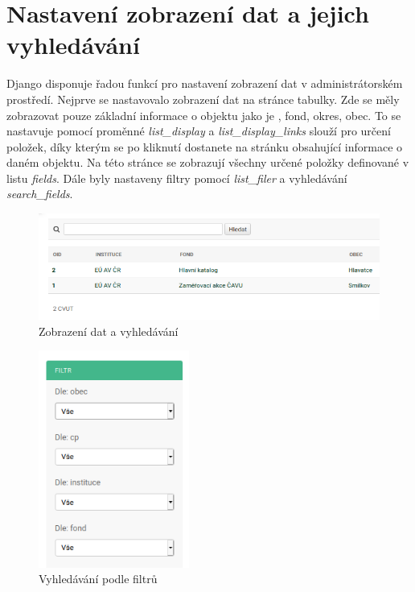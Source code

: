 \section{Nastavení zobrazení dat a jejich vyhledávání}

Django disponuje řadou funkcí pro nastavení zobrazení dat v administrátorském prostředí. Nejprve se nastavovalo zobrazení dat na stránce tabulky. Zde se měly zobrazovat pouze základní informace o objektu jako je , fond, okres, obec. To se nastavuje pomocí proměnné \emph{list\_display} a \emph{list\_display\_links} slouží pro určení položek, díky kterým se po kliknutí dostanete na stránku obsahující informace o daném objektu. Na této stránce se zobrazují všechny určené položky definované v listu \emph{fields}. Dále byly nastaveny filtry pomocí \emph{list\_filer} a vyhledávání \emph{search\_fields}. 

\begin{figure}[H] \centering
    \includegraphics[width=400pt]{./pictures/21-zobrazeni-dat.PNG}
    \caption[Zobrazení dat a vyhledávání]{Zobrazení dat a vyhledávání}
	\label{fig:Zobrazení dat a vyhledávání}              
\end{figure}

\begin{figure}[H] \centering
    \includegraphics[width=140pt]{./pictures/22-filtry.PNG}
    \caption[Vyhledávání podle filtrů]{Vyhledávání podle filtrů}
	\label{fig:Vyhledávání podle filtrů}              
\end{figure}

